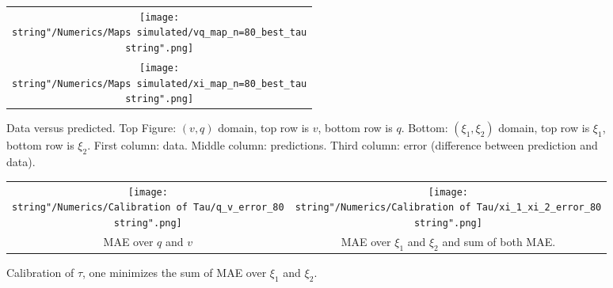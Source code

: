 \documentclass[preprint]{elsarticle}
\begin{document}
\begin{figure}[H]
\centering
\begin{tabular}{c}
\texttt{[image: \\string"/Numerics/Maps simulated/vq\_map\_n=80\_best\_tau\\string".png]}\tabularnewline
\texttt{[image: \\string"/Numerics/Maps simulated/xi\_map\_n=80\_best\_tau\\string".png]}
\end{tabular}
\protect\caption{Data versus predicted. Top Figure: $\left(v,q\right)$ domain, top row is $v$, bottom row is $q$. Bottom: $\left(\xi_{1},\xi_{2}\right)$
domain, top row is $\xi_{1}$, bottom row is $\xi_{2}$. First column: data. Middle column: predictions. Third column: error (difference between prediction and data).\label{fig:Data-versus-predicted.}}
\end{figure}

\begin{figure}[H]
\centering
\begin{tabular}{cc}
\texttt{[image: \\string"/Numerics/Calibration of Tau/q\_v\_error\_80\\string".png]} & \texttt{[image: \\string"/Numerics/Calibration of Tau/xi\_1\_xi\_2\_error\_80\\string".png]}\tabularnewline
MAE over $q$ and $v$ & MAE over $\xi_{1}$ and $\xi_{2}$ and sum of both MAE.\tabularnewline
\end{tabular}
\protect\caption{Calibration of $\tau$, one minimizes the sum of MAE over $\xi_{1}$
and $\xi_{2}$.}
\end{figure}
\end{document}
